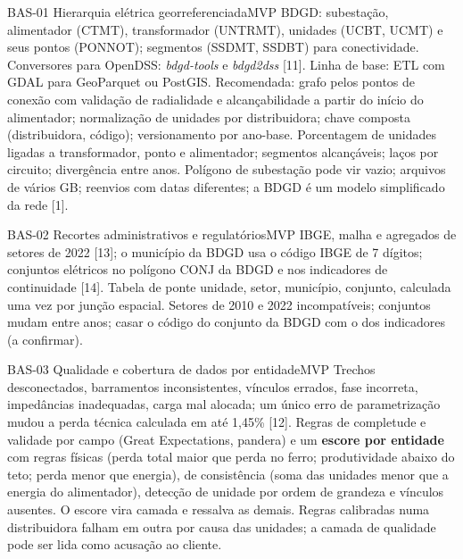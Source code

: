 \begin{ficha}{BAS-01 \textperiodcentered{} Hierarquia elétrica georreferenciada}{MVP}
 BDGD: subestação, alimentador (CTMT), transformador (UNTRMT),
unidades (UCBT, UCMT) e seus pontos (PONNOT); segmentos (SSDMT, SSDBT) para
conectividade. Conversores para OpenDSS: \emph{bdgd-tools} e
\emph{bdgd2dss} [11].
 Linha de base: ETL com GDAL para GeoParquet ou PostGIS.
Recomendada: grafo pelos pontos de conexão com validação de radialidade e
alcançabilidade a partir do início do alimentador; normalização de unidades
por distribuidora; chave composta (distribuidora, código); versionamento por
ano-base.
 Porcentagem de unidades ligadas a transformador, ponto e
alimentador; segmentos alcançáveis; laços por circuito; divergência entre
anos.
 Polígono de subestação pode vir vazio; arquivos de vários
GB; reenvios com datas diferentes; a BDGD é um modelo simplificado da rede
[1].
\end{ficha}

\begin{ficha}{BAS-02 \textperiodcentered{} Recortes administrativos e regulatórios}{MVP}
 IBGE, malha e agregados de setores de 2022 [13]; o município da
BDGD usa o código IBGE de 7 dígitos; conjuntos elétricos no polígono CONJ da
BDGD e nos indicadores de continuidade [14].
 Tabela de ponte unidade, setor, município, conjunto,
calculada uma vez por junção espacial.
 Setores de 2010 e 2022 incompatíveis; conjuntos mudam
entre anos; casar o código do conjunto da BDGD com o dos indicadores (a
confirmar).
\end{ficha}

\begin{ficha}{BAS-03 \textperiodcentered{} Qualidade e cobertura de dados por entidade}{MVP}
 Trechos desconectados, barramentos
inconsistentes, vínculos errados, fase incorreta, impedâncias inadequadas,
carga mal alocada; um único erro de parametrização mudou a perda técnica
calculada em até 1,45\% [12].
 Regras de completude e validade por campo (Great
Expectations, pandera) e um \textbf{escore por entidade} com regras físicas
(perda total maior que perda no ferro; produtividade abaixo do teto; perda
menor que energia), de consistência (soma das unidades menor que a energia do
alimentador), detecção de unidade por ordem de grandeza e vínculos ausentes.
O escore vira camada e ressalva as demais.
 Regras calibradas numa distribuidora falham em outra por
causa das unidades; a camada de qualidade pode ser lida como acusação ao
cliente.
\end{ficha}

